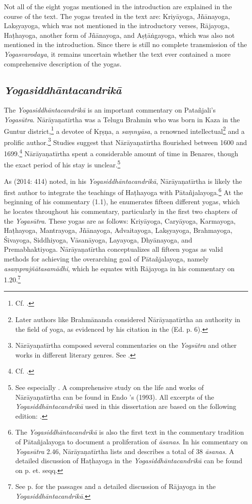 Not all of the eight yogas mentioned in the introduction are explained in the course of the text. The yogas treated in the text are: Kriyāyoga, Jñānayoga, Lakṣyayoga, which was not mentioned in the introductory verses, Rājayoga, Haṭhayoga, another form of Jñānayoga, and Aṣṭāṅgayoga, which was also not mentioned in the introduction. Since there is still no complete transmission of the \emph{Yogasvarodaya}, it remains uncertain whether the text ever contained a more comprehensive description of the yogas.

\subsection{\emph{Yogasiddhāntacandrikā}}

The \emph{Yogasiddhāntacandrikā} is an important commentary on Patañjali's \emph{Yogasūtra}. Nārāyaṇatīrtha was a Telugu Brahmin who was born in Kaza in the Guntur district,\footnote{Cf. \citeauthor[1993: 43]{endo1993}.} a devotee of Kṛṣṇa, a \textit{saṃnyāsa}, a renowned intellectual\footnote{Later authors like Brahmānanda considered Nārāyaṇatīrtha an authority in the field of yoga, as evidenced by his citation in the  (Ed. p. 6).} and a prolific author.\footnote{Nārāyaṇatīrtha composed several commentaries on the \emph{Yogsūtra} and other works in different literary genres. See \citeauthor[2004: 20-21]{penna2004}.} Studies suggest that Nārāyaṇatīrtha flourished between 1600 and 1699.\footnote{Cf. \citeauthor[1993: 56]{endo1993}.} Nārāyaṇatīrtha spent a considerable amount of time in Benares, though the exact period of his stay is unclear.\footnote{See especially \citeauthor[2004: 24]{penna2004}. A comprehensive study on the life and works of Nārāyaṇatīrtha can be found in Endo \citeauthor{endo1993}'s  (1993). All excerpts of the \emph{Yogasiddhāntacandrikā} used in this dissertation are based on the following edition: .}

As \citeauthor{birch2014} (2014: 414) noted, in his \emph{Yogasiddhāntacandrikā}, Nārāyaṇatīrtha is likely the first author to integrate the teachings of Haṭhayoga with Pātañjalayoga.\footnote{The \emph{Yogasiddhāntacandrikā} is also the first text in the commentary tradition of Pātañjalayoga to document a proliferation of \textit{āsanas}. In his commentary on \emph{Yogasūtra} 2.46, Nārāyaṇatīrtha lists and describes a total of 38 \textit{āsanas}. A detailed discussion of Haṭhayoga in the \emph{Yogasiddhāntacandrikā} can be found on p. \pageref{hathacandrika} et. seqq.} At the beginning of his commentary (1.1), he enumerates fifteen different yogas, which he locates throughout his commentary, particularly in the first two chapters of the \emph{Yogasūtra}. These yogas are as follows: Kriyāyoga, Caryāyoga, Karmayoga, Haṭhayoga, Mantrayoga, Jñānayoga, Advaitayoga, Lakṣyayoga, Brahmayoga, Śivayoga, Siddhiyoga, Vāsanāyoga, Layayoga, Dhyānayoga, and Premabhaktiyoga. Nārāyaṇatīrtha conceptualizes all fifteen yogas as valid methods for achieving the overarching goal of Pātañjalayoga, namely \textit{asaṃprajñātasamādhi}, which he equates with Rājayoga in his commentary on 1.20.\footnote{See p. \pageref{rajacandrika} for the passages and a detailed discussion of Rājayoga in the \emph{Yogasiddhāntacandrikā}.}

